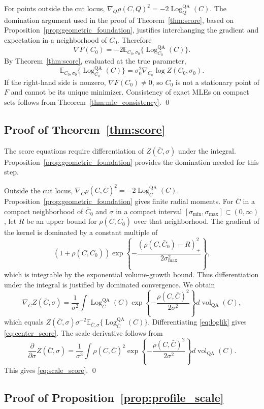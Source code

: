 \documentclass[
  12pt]{article}
\newcommand{\vol}{\operatorname{vol}}
\newcommand{\Log}{\operatorname{Log}}
\newcommand{\E}{\mathbb E}
\newcommand{\QA}{\mathrm{QA}}
\begin{document}
For points outside the cut locus, $\nabla_Q\rho(C,Q)^2=-2\Log^{\QA}_Q(C)$. The domination argument used in the proof of Theorem~\ref{thm:score}, based on Proposition~\ref{prop:geometric_foundation}, justifies interchanging the gradient and expectation in a neighborhood of $C_0$. Therefore
\[
\nabla F(C_0)=-2\E_{C_0,\sigma_0}\{\Log^{\QA}_{C_0}(C)\}.
\]
By Theorem~\ref{thm:score}, evaluated at the true parameter,
\[
\E_{C_0,\sigma_0}\{\Log^{\QA}_{C_0}(C)\}=\sigma_0^2\nabla_{C_0}\log Z(C_0,\sigma_0).
\]
If the right-hand side is nonzero, $\nabla F(C_0)\ne0$, so $C_0$ is not a stationary point of $F$ and cannot be its unique minimizer. Consistency of exact MLEs on compact sets follows from Theorem~\ref{thm:mle_consistency}. \qed

\subsection{Proof of Theorem~\ref{thm:score}}

The score equations require differentiation of $Z(\bar C,\sigma)$ under the integral. Proposition~\ref{prop:geometric_foundation} provides the domination needed for this step.

Outside the cut locus, $\nabla_{\bar C}\rho(C,\bar C)^2=-2\Log^{\QA}_{\bar C}(C)$. Proposition~\ref{prop:geometric_foundation} gives finite radial moments. For $\bar C$ in a compact neighborhood of $\bar C_0$ and $\sigma$ in a compact interval $[\sigma_{\min},\sigma_{\max}]\subset(0,\infty)$, let $R$ be an upper bound for $\rho(\bar C,\bar C_0)$ over that neighborhood. The gradient of the kernel is dominated by a constant multiple of
\[
(1+\rho(C,\bar C_0))\exp\left\{-\frac{(\rho(C,\bar C_0)-R)_+^2}{2\sigma_{\max}^2}\right\},
\]
which is integrable by the exponential volume-growth bound. Thus differentiation under the integral is justified by dominated convergence. We obtain
\[
\nabla_{\bar C}Z(\bar C,\sigma)=\frac{1}{\sigma^2}\int \Log^{\QA}_{\bar C}(C)\exp\left\{-\frac{\rho(C,\bar C)^2}{2\sigma^2}\right\}d\vol_{\QA}(C),
\]
which equals $Z(\bar C,\sigma)\sigma^{-2}\E_{\bar C,\sigma}\{\Log^{\QA}_{\bar C}(C)\}$. Differentiating \eqref{eq:loglik} gives \eqref{eq:center_score}. The scale derivative follows from
\[
\frac{\partial}{\partial\sigma}Z(\bar C,\sigma)=\frac{1}{\sigma^3}\int\rho(C,\bar C)^2\exp\left\{-\frac{\rho(C,\bar C)^2}{2\sigma^2}\right\}d\vol_{\QA}(C).
\]
This gives \eqref{eq:scale_score}. \qed

\subsection{Proof of Proposition~\ref{prop:profile_scale}}
\end{document}
